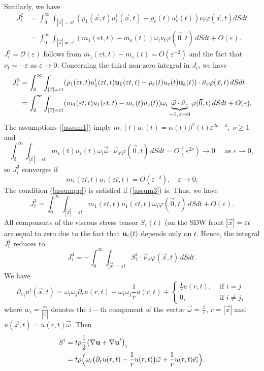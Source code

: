 \documentclass[reqno]{article}%
\theoremstyle{plain}
\theoremstyle{definition}
\theoremstyle{remark}
\numberwithin{equation}{section}
\begin{document}
Similarly, we have
\[\begin{split}
J_i^2&=\int_0^\infty \int_{|\vec{x}|=\varepsilon t}(\rho_1(\vec{x},t)u_1^i(\vec{x},t)-\rho_\varepsilon(t)u_\varepsilon^i(t))\nu_t \varphi(\vec{x},t) dSdt\\
&=\int_0^\infty \int_{|\vec{x}|=\varepsilon t} (m_1(\varepsilon t,t)-m_\varepsilon(t))\omega_i\nu_t\varphi(\vec{0},t)\,dSdt+O(\varepsilon).
\end{split}\]
$J_i^2=\mathcal{O}(\varepsilon)$ follows from $m_1(\varepsilon t,t)-m_\varepsilon(t)=O(\varepsilon^{-2})$ and the fact that $\nu_t\sim -\varepsilon$ as $\varepsilon\to 0$.
Concerning the third non-zero integral in $J_i$, we have 
\[\begin{split}
J_i^3&=\int_0^\infty\int_{|\vec{x}|= \varepsilon t} (\rho_1(\varepsilon t,t)u_1^i(\varepsilon t,t){\bf u_1}(\varepsilon t,t)-\rho_\varepsilon(t)u_\varepsilon(t){\bf u}_\varepsilon(t))\cdot \vec{\nu}_x \varphi(\vec{x},t)\,dSdt\\
&= \int_0^\infty \int_{|\vec{x}|=\varepsilon t} (m_1(\varepsilon t,t)u_1(\varepsilon t,t)-m_\varepsilon(t)u_\varepsilon(t))\omega_i\underbrace{\vec{\omega}\cdot \vec{\nu}_x}_{\sim 1,\,\varepsilon\to 0}\varphi(\vec{0},t)\,dSdt+O(\varepsilon).
\end{split}\]
The assumptions (\ref{assum1}) imply $m_\varepsilon(t)u_\varepsilon(t)=\alpha(t)\beta^2(t)\varepsilon^{2\nu-3},$ $\nu\geq 1$ and
\[\int_0^\infty \int_{|\vec{x}|=\varepsilon t} m_\varepsilon(t)u_\varepsilon(t)\omega_i\vec{\omega}\cdot \vec{\nu}_x\varphi(\vec{0},t)\,dSdt=O(\varepsilon^{2\nu})\to 0 \quad \text{ as } \varepsilon\to 0,\]
so $J_i^3$ converges if
\begin{equation}\label{assumpp}
m_1(\varepsilon t,t)u_1(\varepsilon t,t)=O(\varepsilon^{-2}), \quad \varepsilon\to 0.
\end{equation}
 The condition (\ref{assumpp}) is satisfied if (\ref{assum3}) is. Thus, we have
\[J_i^3=\int_0^\infty \int_{|\vec{x}|=\varepsilon t} m_1(\varepsilon t,t)u_1(\varepsilon t,t)\omega_i \varphi(\vec{0},t)\,dSdt+O(\varepsilon).\]
 All components of  the viscous stress tensor $S_\varepsilon(t)$ (on the SDW front $|\vec{x}|=\varepsilon t$  are equal to zero due to the fact that ${\bf u}_\varepsilon(t)$ depends only on $t$. Hence, the integral $J_i^4$ reduces to
\[J_i^4=-\int_0^\infty \int_{|\vec{x}|=\varepsilon t} S_1^i\cdot \vec{\nu}_x\varphi(\vec{x},t)\,dSdt.\]
We have
\[\partial_{x_j}u^i(\vec{x},t)=\omega_i \omega_j \partial_r u(r,t)-\omega_i\omega_j\frac{1}{r}u(r,t)+\begin{cases}
\frac{1}{r}u(r,t), & \text{ if } i=j\\
0, & \text{ if } i\neq j,
\end{cases}\]
where $w_i=\frac{x_i}{|\vec{x}|}$ denotes the $i-$th component of the vector $\vec{\omega}=\frac{\vec{x}}{r}$, $r=|\vec{x}|$ and $u(\vec{x},t)=u(r,t)\vec{\omega}.$
Then
\[\begin{split}
S^i&=t\rho \frac{1}{2}\big(\nabla{\bf u}+\nabla {\bf u}^t\big)_i\\
&=t\rho\Big(\omega_i\big(\partial_r u(r,t)-\frac{1}{r}u(r,t)\big)\vec{\omega}+\frac{1}{r}u(r,t)\vec{e_i}\Big).
\end{split}\]
\end{document}
